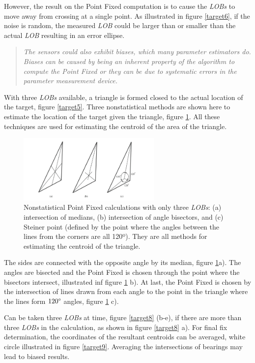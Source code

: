 \documentclass[english,purist]{ist-report}
\begin{document}
However, the result on the Point Fixed computation is to cause the \textit{LOBs} to move away from crossing at a single point. As illustrated in figure \ref{target6}, if the noise is random, the measured \textit{LOB} could be larger than or smaller than the actual \textit{LOB} resulting in an error ellipse. 

\begin{quote} \itshape
The sensors could also exhibit biases, which many parameter estimators do. Biases can be caused by being an inherent property of the algorithm to compute the Point Fixed or they can be due to systematic errors in the parameter measurement device. \end{quote}\cite{poiseltarget}

With three \textit{LOBs} available, a triangle is formed closed to the actual location of the target, figure \ref{target5}. Three nonstatistical methods are shown here to estimate the location of the target given the triangle, figure \ref{target7}.  All these techniques are used for estimating the centroid of the area of the triangle. 

\begin{figure}[ht]
\centering
\includegraphics[width=70mm]{target7.png}
\caption{Nonstatistical Point Fixed calculations with only three \textit{LOBs}: (a) intersection of medians, (b)
intersection of angle bisectors, and (c) Steiner point (defined by the point where the angles between the lines from the corners are all 120º). They are all methods for estimating the centroid of the triangle.}
\label{target7}
\end{figure} 



The sides are connected with the opposite angle by its median, figure \ref{target7}a). The angles are bisected and the Point Fixed is chosen through the point where the bisectors intersect, illustrated inf figure \ref{target7} b). At last, the Point Fixed is chosen by the intersection of lines drawn from each angle to the point in the triangle where the lines form $120\degree$ angles, figure \ref{target7} c).  

Can be taken three \textit{LOBs} at time, figure \ref{target8} (b-e), if there are more than three \textit{LOBs} in the calculation, as shown in figure \ref{target8} a). For final fix determination, the coordinates of the resultant centroids can be averaged, white circle illustrated in figure \ref{target9}. Averaging the intersections of bearings may lead to biased results. 
\end{document}
